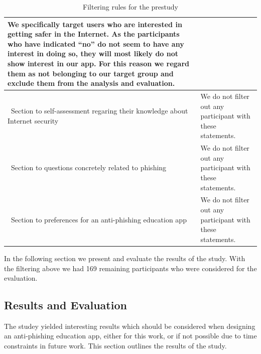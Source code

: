 \begin{table}[hHtbp]
\begin{tabular}{ | p{5cm} | p{10cm} |}
 We specifically target users who are interested in getting safer in the Internet.
 As the participants who have indicated ``no'' do not seem to have any interest in doing so, they will most likely do not show interest in our app.
 For this reason we regard them as not belonging to our target group and exclude them from the analysis and evaluation.
\\
    \hline\  Section to self-assessment regaring their knowledge about Internet security &  We do not filter out any participant with these statements.
\\
		\hline\  Section to questions concretely related to phishing & We do not filter out any participant with these statements.
 \\
    \hline\  Section to preferences for an anti-phishing education app & We do not filter out any participant with these statements.
\\
    \hline
    \end{tabular}
    \caption{Filtering rules for the prestudy}
    \label{table:prestudy_filter}
    
\end{table}

In the following section we present and evaluate the results of the study.
 With the filtering above we had 169 remaining participants who were considered for the evaluation.

\subsection{Results and Evaluation}
The studey yielded interesting results which should be considered when designing an anti-phishing education app, either for this work, or if not possible due to time constraints in future work.
 This section outlines the results of the study.


